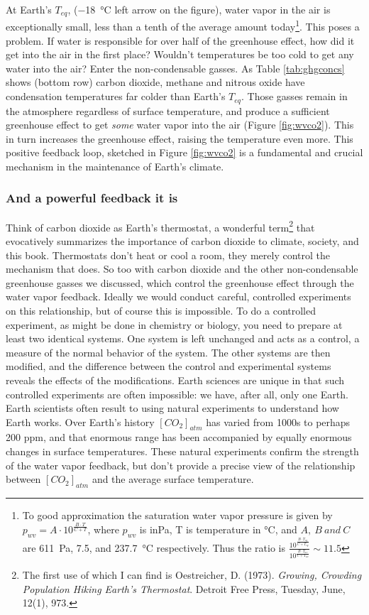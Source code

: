 At Earth's $T_{eq}$, (\SI{-18}{\celsius} left arrow on the figure), water vapor in the air is exceptionally small, less than a tenth of the average amount today\footnote{To good approximation the saturation water vapor pressure is given by $p_{wv}=A \cdot 10^{\frac{B \cdot T}{C+T}}$, where $p_{wv}$ is in\si{\pascal}, T is temperature in \si{\celsius}, and $A,\ B \ and \ C$ are \SI{611}{\pascal}, 7.5, and \SI{237.7}{\celsius} respectively. Thus the ratio is $\frac{10^{\frac{B \cdot T_{eq}}{C+T_{eq}}}}{10^{\frac{B \cdot T_{av}}{C+T_{av}}}}\sim 11.5$}. This poses a problem. If water is responsible for over half of the greenhouse effect, how did it get into the air in the first place? Wouldn't temperatures be too cold to get any water into the air? Enter the non-condensable gasses. As Table \ref{tab:ghgconcs} shows (bottom row) carbon dioxide, methane and nitrous oxide have condensation temperatures far colder than Earth's $T_{eq}$. Those gasses remain in the atmosphere regardless of surface temperature, and produce a sufficient greenhouse effect to get \emph{some} water vapor into the air (Figure \ref{fig:wvco2}). This in turn increases the greenhouse effect, raising the temperature even more. This positive feedback loop, sketched in Figure \ref{fig:wvco2} is a fundamental and crucial mechanism in the maintenance of Earth's climate.

\subsubsection{And a powerful feedback it is}
Think of carbon dioxide as Earth's thermostat, a wonderful term\footnote{The first use of which I can find is Oestreicher, D. (1973). \textit{Growing, Crowding Population Hiking Earth's Thermostat}. Detroit Free Press, Tuesday, June, 12(1), 973.} that evocatively summarizes the importance of carbon dioxide to climate, society, and this book. Thermostats don't heat or cool a room, they merely control the mechanism that does. So too with carbon dioxide and the other non-condensable greenhouse gasses we discussed, which control the greenhouse effect through the water vapor feedback.
Ideally we would conduct careful, controlled experiments on this relationship, but of course this is impossible. To do a controlled experiment, as might be done in chemistry or biology, you need to prepare at least two identical systems. One system is left unchanged and acts as a control, a measure of the normal behavior of the system. The other systems are then modified, and the difference between the control and experimental systems reveals the effects of the modifications. Earth sciences are unique in that such controlled experiments are often impossible: we have, after all, only one Earth. Earth scientists often result to using natural experiments to understand how Earth works. Over Earth's history $[CO_2]_{atm}$ has varied from 1000s to perhaps 200 ppm, and that enormous range has been accompanied by equally enormous changes in surface temperatures. These natural experiments confirm the strength of the water vapor feedback, but don't provide a precise view of the relationship between $[CO_2]_{atm}$ and the average surface temperature.\\

